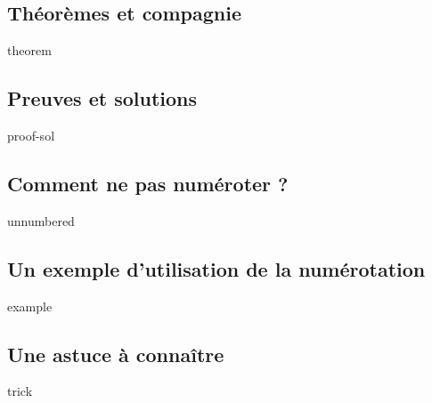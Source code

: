 \subsection{Théorèmes et compagnie}

{theorem}



\subsection{Preuves et solutions}

{proof-sol}



\subsection{Comment ne pas numéroter ?}

{unnumbered}



\subsection{Un exemple d'utilisation de la numérotation}

{example}



\subsection{Une astuce à connaître}

{trick}
